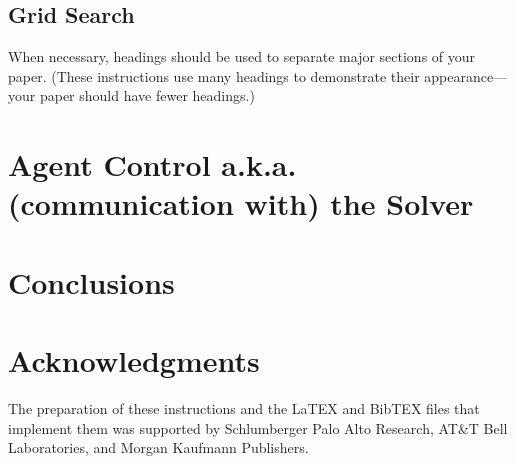 \documentclass{article}
\begin{document}
\subsection{Grid Search}

When necessary, headings should be used to separate major sections of your
paper.
(These instructions use many headings to demonstrate their
appearance---your paper should have fewer headings.)


\section{Agent Control a.k.a. (communication with) the Solver}

\section{Conclusions}

\section*{Acknowledgments}
The preparation of these instructions and the LaTEX and BibTEX files that implement them was supported by Schlumberger Palo Alto Research, AT\&T Bell Laboratories, and Morgan Kaufmann Publishers.
\end{document}
